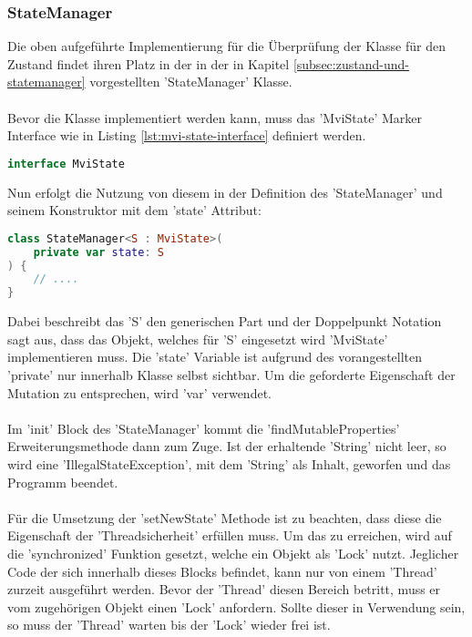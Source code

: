 \subsubsection{StateManager}
\label{subsubsec:state-manager}
Die oben aufgeführte Implementierung für die Überprüfung der Klasse für den Zustand findet ihren Platz in der in der in Kapitel
\ref{subsec:zustand-und-statemanager}
vorgestellten 'StateManager' Klasse.
\\\\
Bevor die Klasse implementiert werden kann, muss das 'MviState' Marker Interface wie in Listing
\ref{lst:mvi-state-interface}
definiert werden.
\begin{lstlisting}[caption={'MviState' Interface}, label={lst:mvi-state-interface}, language=Kotlin]
interface MviState
\end{lstlisting}
\bigskip
Nun erfolgt die Nutzung von diesem in der Definition des 'StateManager' und seinem Konstruktor mit dem 'state' Attribut:
\begin{lstlisting}[caption={ 'StateManager' mit 'MviState'}, label={lst:state-manger-definiton}, language=Kotlin]
class StateManager<S : MviState>(
	private var state: S
) {
	// ....
}
\end{lstlisting}
Dabei beschreibt das 'S' den generischen Part und der Doppelpunkt Notation sagt aus, dass das Objekt, welches für 'S' eingesetzt wird 'MviState' implementieren muss. Die 'state' Variable ist aufgrund des vorangestellten 'private' nur innerhalb Klasse selbst sichtbar. Um die geforderte Eigenschaft der Mutation zu entsprechen, wird 'var' verwendet. 
\\\\
Im 'init' Block des 'StateManager' kommt die 'findMutableProperties' Erweiterungsmethode dann zum Zuge. Ist der erhaltende 'String' nicht leer, so wird eine 'IllegalStateException', mit dem 'String' als Inhalt, geworfen und das Programm beendet.
\\\\
Für die Umsetzung der 'setNewState' Methode ist zu beachten, dass diese die Eigenschaft der 'Threadsicherheit' erfüllen muss. Um das zu erreichen, wird auf die 'synchronized' Funktion gesetzt, welche ein Objekt als 'Lock' nutzt. Jeglicher Code der sich innerhalb dieses Blocks befindet, kann nur von einem 'Thread' zurzeit ausgeführt werden. Bevor der 'Thread' diesen Bereich betritt, muss er vom zugehörigen Objekt einen 'Lock' anfordern. Sollte dieser in Verwendung sein, so muss der 'Thread' warten bis der 'Lock' wieder frei ist. 
\\\\
